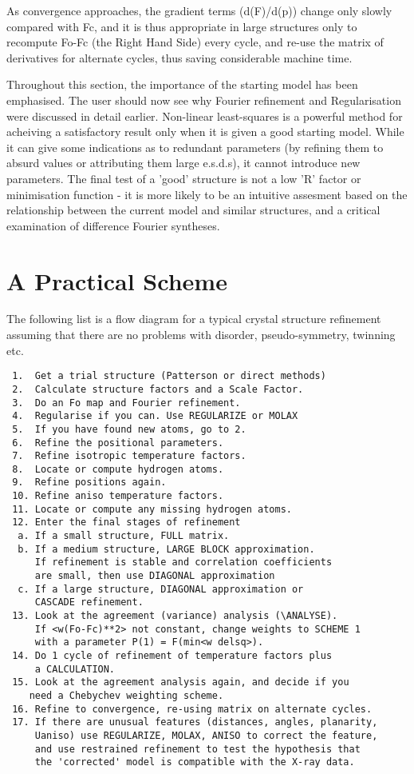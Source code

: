 \documentclass[10pt,a4paper]{report}
\begin{document}
As convergence approaches, the gradient terms (d(F)/d(p)) change only slowly
 compared with Fc, and it is thus appropriate in large structures only to 
 recompute Fo-Fc (the Right Hand Side) every cycle, and re-use
 the matrix of derivatives for alternate cycles, thus saving considerable
 machine time.


Throughout this section, the importance of the starting model has been 
 emphasised. The user should now see why Fourier refinement and Regularisation
 were discussed in detail earlier. Non-linear least-squares is a powerful
 method for acheiving a satisfactory result only when it is given a good
 starting model. While it can give some indications as to redundant parameters
 (by refining them to absurd values or attributing them large e.s.d.s),
 it cannot introduce new parameters. The final test of a 'good' structure
 is not a low 'R' factor or minimisation function - it is more likely to be
 an intuitive assesment based on the relationship between the current model and
 similar structures, and a critical examination of difference Fourier
 syntheses.
\section{A Practical Scheme}


The following list is a flow diagram for a typical
 crystal structure refinement assuming that there are no problems with
 disorder, pseudo-symmetry, twinning etc.

\small\begin{verbatim}
 1.  Get a trial structure (Patterson or direct methods)
 2.  Calculate structure factors and a Scale Factor.
 3.  Do an Fo map and Fourier refinement.
 4.  Regularise if you can. Use REGULARIZE or MOLAX
 5.  If you have found new atoms, go to 2.
 6.  Refine the positional parameters.
 7.  Refine isotropic temperature factors.
 8.  Locate or compute hydrogen atoms.
 9.  Refine positions again.
 10. Refine aniso temperature factors.
 11. Locate or compute any missing hydrogen atoms.
 12. Enter the final stages of refinement
  a. If a small structure, FULL matrix.
  b. If a medium structure, LARGE BLOCK approximation.
     If refinement is stable and correlation coefficients  
     are small, then use DIAGONAL approximation
  c. If a large structure, DIAGONAL approximation or 
     CASCADE refinement.
 13. Look at the agreement (variance) analysis (\ANALYSE).
     If <w(Fo-Fc)**2> not constant, change weights to SCHEME 1 
     with a parameter P(1) = F(min<w delsq>).
 14. Do 1 cycle of refinement of temperature factors plus 
     a CALCULATION.
 15. Look at the agreement analysis again, and decide if you 
    need a Chebychev weighting scheme.
 16. Refine to convergence, re-using matrix on alternate cycles.
 17. If there are unusual features (distances, angles, planarity, 
     Uaniso) use REGULARIZE, MOLAX, ANISO to correct the feature, 
     and use restrained refinement to test the hypothesis that 
     the 'corrected' model is compatible with the X-ray data.
\end{verbatim}\normalsize
\end{document}
